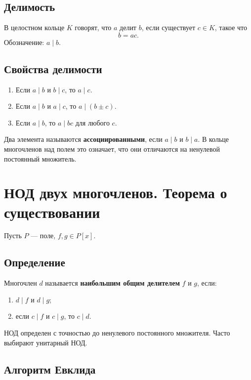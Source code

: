\documentclass[12pt,a4paper]{article}
\begin{document}
\subsection*{Делимость}

В целостном кольце $K$ говорят, что $a$ делит $b$, если существует $c\in K$, такое что
\[
    b=ac.
\]
Обозначение: $a\mid b$.

\subsection*{Свойства делимости}

\begin{enumerate}
    \item Если $a\mid b$ и $b\mid c$, то $a\mid c$.
    \item Если $a\mid b$ и $a\mid c$, то $a\mid (b\pm c)$.
    \item Если $a\mid b$, то $a\mid bc$ для любого $c$.
\end{enumerate}

Два элемента называются \textbf{ассоциированными}, если $a\mid b$ и $b\mid a$. В кольце многочленов над полем это означает, что они отличаются на ненулевой постоянный множитель.

\section{НОД двух многочленов. Теорема о существовании}

Пусть $P$ --- поле, $f,g\in P[x]$.

\subsection*{Определение}

Многочлен $d$ называется \textbf{наибольшим общим делителем} $f$ и $g$, если:
\begin{enumerate}
    \item $d\mid f$ и $d\mid g$;
    \item если $c\mid f$ и $c\mid g$, то $c\mid d$.
\end{enumerate}

НОД определен с точностью до ненулевого постоянного множителя. Часто выбирают унитарный НОД.

\subsection*{Алгоритм Евклида}
\end{document}
